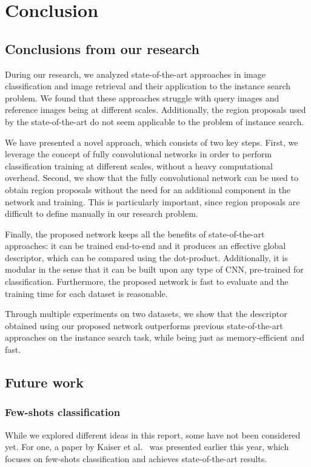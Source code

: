 
\chapter{Conclusion}
\section{Conclusions from our research}
During our research, we analyzed state-of-the-art approaches in
image classification and image retrieval and their application to
the instance search problem. We found that these approaches struggle
with query images and reference images being at different scales.
Additionally, the region proposals used by the state-of-the-art do not
seem applicable to the problem of instance search.

We have presented a novel approach, which consists of two key steps.
First, we leverage the concept of fully convolutional networks in order
to perform classification training at different scales, without a heavy
computational overhead. Second, we show that the fully convolutional
network can be used to obtain region proposals without the need for
an additional component in the network and training. This is particularly
important, since region proposals are difficult to define manually in
our research problem.

Finally, the proposed network keeps all the benefits of state-of-the-art
approaches: it can be trained end-to-end and it produces an effective
global descriptor, which can be compared using the dot-product.
Additionally, it is modular in the sense that it can be built upon
any type of CNN, pre-trained for classification.
Furthermore, the proposed network is fast to evaluate and the training
time for each dataset is reasonable.

Through multiple experiments on two datasets, we show that the descriptor
obtained using our proposed network outperforms previous state-of-the-art
approaches on the instance search task, while being just as memory-efficient
and fast.

\section{Future work}
\subsection{Few-shots classification}
While we explored different ideas in this report, some have not been
considered yet. For one, a paper by Kaiser et al.~\cite{kaiser_learning_2017}
was presented earlier this year, which focuses on few-shots classification
and achieves state-of-the-art results.

